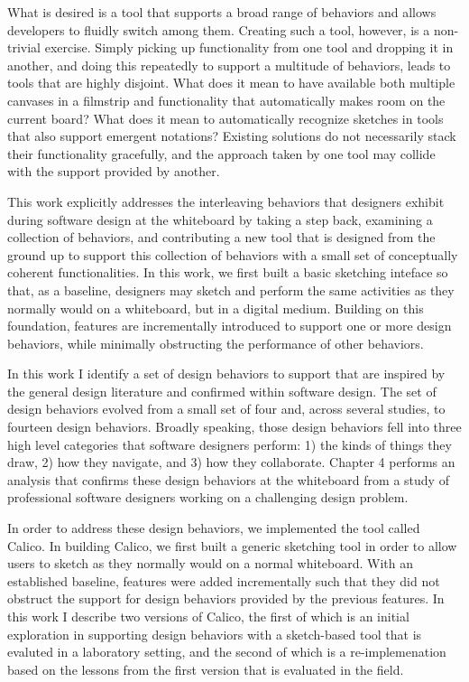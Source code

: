 What is desired is a tool that supports a broad range of behaviors and allows developers to fluidly switch among them. Creating such a tool, however, is a non-trivial exercise. Simply picking up functionality from one tool and dropping it in another, and doing this repeatedly to support a multitude of behaviors, leads to tools that are highly disjoint. What does it mean to have available both multiple canvases in a filmstrip and functionality that automatically makes room on the current board?  What does it mean to automatically recognize sketches in tools that also support emergent notations? Existing solutions do not necessarily stack their functionality gracefully, and the approach taken by one tool may collide with the support provided by another.

This work explicitly addresses the interleaving behaviors that designers exhibit during software design at the whiteboard by taking a step back, examining a collection of behaviors, and contributing a new tool that is designed from the ground up to support this collection of behaviors with a small set of conceptually coherent functionalities. In this work, we first built a basic sketching inteface so that, as a baseline, designers may sketch and perform the same activities as they normally would on a whiteboard, but in a digital medium. Building on this foundation, features are incrementally introduced to support one or more design behaviors, while minimally obstructing the performance of other behaviors.

In this work I identify a set of design behaviors to support that are inspired by the general design literature and confirmed within software design. The set of design behaviors evolved from a small set of four and, across several studies, to fourteen design behaviors. Broadly speaking, those design behaviors fell into three high level categories that software designers perform: 1) the kinds of things they draw, 2) how they navigate, and 3) how they collaborate. Chapter 4 performs an analysis that confirms these design behaviors at the whiteboard from a study of professional software designers working on a challenging design problem.

In order to address these design behaviors, we implemented the tool called Calico. In building Calico, we first built a generic sketching tool in order to allow users to sketch as they normally would on a normal whiteboard. With an established baseline, features were added incrementally such that they did not obstruct the support for design behaviors provided by the previous features. In this work I describe two versions of Calico, the first of which is an initial exploration in supporting design behaviors with a sketch-based tool that is evaluted in a laboratory setting, and the second of which is a re-implemenation based on the lessons from the first version that is evaluated in the field.


